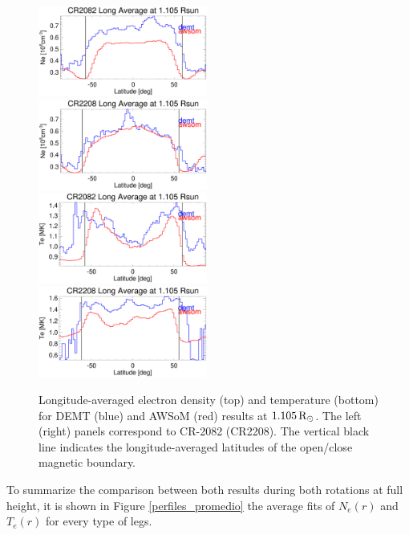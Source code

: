 \documentclass[namedreferences]{solarphysics}
\newcommand{\mrsun}{{\rm R_\odot}}
\begin{document}
\begin{article}
\begin{figure}[h!]
\begin{center}
\includegraphics[width=0.495\textwidth]{figs/Perfil_Ne_demt_awsom_2082_1105.eps}
\includegraphics[width=0.495\textwidth]{figs/Perfil_Ne_demt_awsom_2208_1105.eps}
\includegraphics[width=0.495\textwidth]{figs/Perfil_Te_demt_awsom_2082_1105.eps}
\includegraphics[width=0.495\textwidth]{figs/Perfil_Te_demt_awsom_2208_1105.eps}
\caption{Longitude-averaged electron density (top) and temperature (bottom) for DEMT (blue) and AWSoM (red) results at $1.105\,\mrsun$. The left (right) panels correspond to CR-2082 (CR2208). The vertical black line indicates the longitude-averaged latitudes of the open/close magnetic boundary.}
\label{perf_lat}
\end{center}
\end{figure}

To summarize the comparison between both results during both rotations at full height, it is shown in Figure \ref{perfiles_promedio} the average fits of $N_e(r)$ and $T_e(r)$ for every type of legs.


\end{article}
\end{document}
